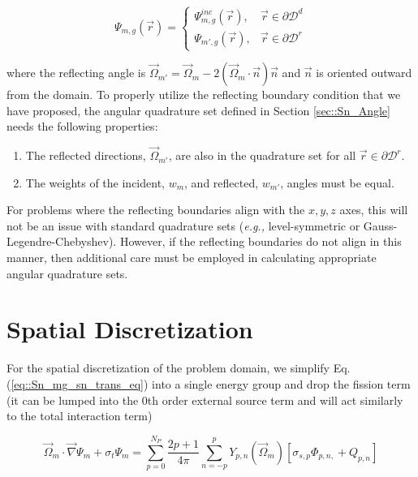 \begin{equation}
\label{eq::Sn_simple_BC}
\Psi_{m,g} (\vec{r}) = \begin{cases}
	\Psi^{inc}_{m,g} (\vec{r}) , & \vec{r} \in \partial \mathcal{D}^d \\
	\Psi_{m',g} (\vec{r}) , & \vec{r} \in \partial \mathcal{D}^r
\end{cases}
\end{equation}

\noindent where the reflecting angle is $\vec{\Omega}_{m'} = \vec{\Omega}_{m} - 2 \left(  \vec{\Omega}_{m} \cdot \vec{n} \right) \vec{n}$ and $\vec{n}$ is oriented outward from the domain. To properly utilize the reflecting boundary condition that we have proposed, the angular quadrature set defined in Section \ref{sec::Sn_Angle} needs the following properties:

\begin{enumerate}
 	\item The reflected directions, $\vec{\Omega}_{m'}$, are also in the quadrature set for all $\vec{r} \in \partial \mathcal{D}^r$.
	\item The weights of the incident, $w_m$, and reflected, $w_{m'}$, angles must be equal.
\end{enumerate} 

\noindent For problems where the reflecting boundaries align with the $x,y,z$ axes, this will not be an issue with standard quadrature sets ({\em e.g.,} level-symmetric or Gauss-Legendre-Chebyshev). However, if the reflecting boundaries do not align in this manner, then additional care must be employed in calculating appropriate angular quadrature sets.

\section{Spatial Discretization}
\label{sec::Sn_Spatial}

For the spatial discretization of the problem domain, we simplify Eq. (\ref{eq::Sn_mg_sn_trans_eq}) into a single energy group and drop the fission term (it can be lumped into the 0th order external source term and will act similarly to the total interaction term)

\begin{equation}
\label{eq::Sn_trans_eq_simple_no_energy_groups}
\vec{\Omega}_m \cdot \vec{\nabla} \Psi_{m}  + \sigma_{t}   \Psi_{m}=  \sum_{p=0}^{N_P} \frac{2p + 1}{4 \pi}    \sum_{n=-p}^{p}  Y_{p,n} (  \vec{\Omega}_m ) \left[ \sigma_{s,p}  \Phi_{p,n,}  + Q_{p,n} \right]
\end{equation}

